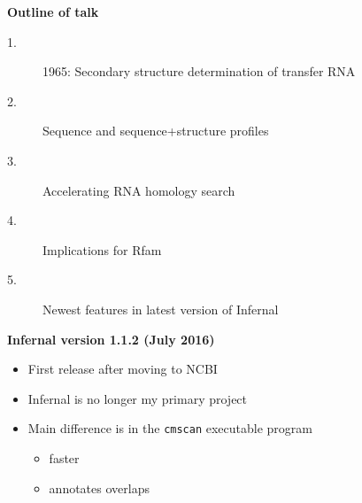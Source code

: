 \documentclass[landscape]{slides}
\begin{document}
\begin{slide}
\begin{center}
\textbf{Outline of talk}

\begin{description}
\item[1.] 1965: Secondary structure determination of transfer RNA
\item[2.] Sequence and sequence+structure profiles
\item[3.] Accelerating RNA homology search
\item[4.] Implications for Rfam
\item[\textcolor{myorange}{5.}] \textcolor{myorange}{Newest features in latest version of Infernal}
\end{description}

\end{center}
\vfill
\end{slide}
\begin{slide}
\begin{center}
\textbf{Infernal version 1.1.2 (July 2016)} \\
\end{center}

\medskip
\begin{itemize}
\item First release after moving to NCBI
\item Infernal is no longer my primary project
\item Main difference is in the \texttt{cmscan} executable program 
\begin{itemize}
  \item faster
  \item annotates overlaps
\end{itemize}
\end{itemize}


\vfill
\end{slide}
\end{document}
